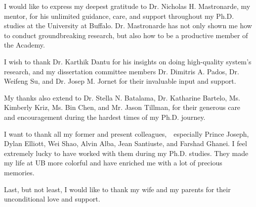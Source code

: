 
I would like to express my deepest gratitude to Dr. Nicholas H. Mastronarde, my mentor, for his unlimited guidance, care, and support throughout my Ph.D. studies at the University at Buffalo. Dr. Mastronarde has not only shown me how to conduct groundbreaking research, but also how to be a productive member of the Academy.

I wish to thank Dr. Karthik Dantu for his insights on doing high-quality system's research, and my dissertation committee members Dr. Dimitris A. Pados, Dr. Weifeng Su, and Dr. Josep M. Jornet for their invaluable input and support.

My thanks also extend to Dr. Stella N. Batalama, Dr. Katharine Bartelo, Ms. Kimberly Kriz, Ms. Bin Chen, and Mr. Jason Tillman, for their generous care and encouragement during the hardest times of my Ph.D. journey.

I want to thank all my former and present colleagues,~~especially Prince Joseph, Dylan Elliott, Wei Shao, Alvin Alba, Jean Santiuste, and Farshad Ghanei. I feel extremely lucky to have worked with them during my Ph.D. studies. They made my life at UB more colorful and have enriched me with a lot of precious memories.

Last, but not least, I would like to thank my wife and my parents for their unconditional love and support.
